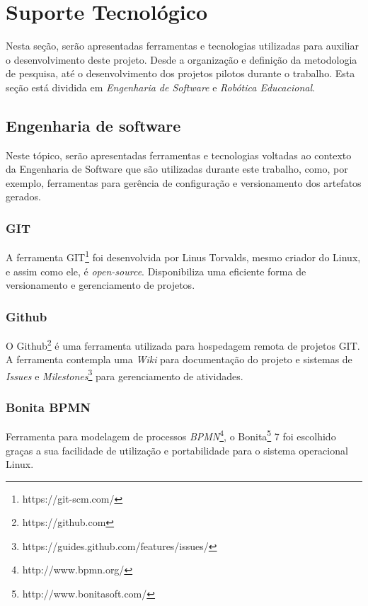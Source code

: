 
\chapter[Suporte Tecnológico]{Suporte Tecnológico}

Nesta seção, serão apresentadas ferramentas e tecnologias utilizadas para auxiliar o desenvolvimento deste projeto. Desde a organização e definição da metodologia de pesquisa, até o desenvolvimento dos projetos pilotos durante o trabalho. Esta seção está dividida em \textit{Engenharia de Software} e \textit{Robótica Educacional}.

\section{Engenharia de software} %
\label{sec:engenharia_de_software}
	Neste tópico, serão apresentadas ferramentas e tecnologias voltadas ao contexto da Engenharia de Software que são utilizadas durante este trabalho, como, por exemplo, ferramentas para gerência de configuração e versionamento dos artefatos gerados.

	\subsection{GIT} %
	\label{sub:git}
	
		A ferramenta GIT\footnote{https://git-scm.com/} foi desenvolvida por Linus Torvalds, mesmo criador do Linux, e assim como ele, é \textit{open-source}. Disponibiliza uma eficiente forma de versionamento e gerenciamento de projetos. 

	\subsection{Github} %
	\label{sub:github}
		O Github\footnote{https://github.com} é uma ferramenta utilizada para hospedagem remota de projetos GIT. A ferramenta contempla uma \textit{Wiki} para documentação do projeto e sistemas de \textit{Issues} e \textit{Milestones}\footnote{https://guides.github.com/features/issues/} para gerenciamento de atividades.

	\subsection{Bonita BPMN} %
	\label{sub:bonita_bpmn}
		Ferramenta para modelagem de processos \textit{BPMN}\footnote{http://www.bpmn.org/}, o Bonita\footnote{http://www.bonitasoft.com/} 7 foi escolhido graças a sua facilidade de utilização e portabilidade para o sistema operacional Linux.

